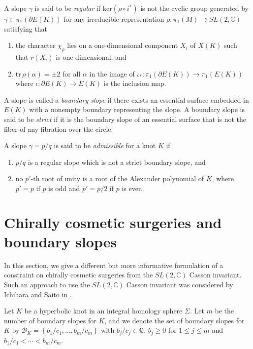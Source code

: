 \documentclass{amsart}
\theoremstyle{remark}
\theoremstyle{definition}
\begin{document}
A slope $\gamma$ is said to be \textit{regular} 
if $\mathrm{ker} (\rho \circ i^*)$ is not the cyclic group generated by $\gamma \in \pi_1 (\partial E(K))$ 
for any irreducible representation $\rho : \pi_1 (M) \to SL (2, \mathbb{C})$ satisfying that 
\begin{enumerate}
\item
the character $\chi_\rho$ lies on a one-dimensional component $X_i$ of $X(K)$ such that $r(X_i)$ is one-dimensional, and 
\item
$\mathrm{tr}\, \rho(\alpha) = \pm 2$ for all $\alpha$ in the image of %
 $\iota_* : \pi_1 (\partial E(K)) \to  \pi_1 (E(K))$ where $\iota:\partial E(K) \rightarrow E(K)$ is the inclusion map.
\end{enumerate}

A slope is called a \textit{boundary slope} if there exists an essential surface embedded in $E(K)$ with a nonempty boundary representing the slope. A boundary slope is said to be \textit{strict} if it is the boundary slope of an essential surface that is not the fiber of any fibration over the circle. 


A slope $\gamma = p/q$ is said to be \textit{admissible} for a knot $K$ if 
\begin{enumerate}
\item 
$p/q$ is a regular slope which is not a strict boundary slope, and 
\item
no $p'$-th root of unity is a root of the Alexander polynomial of $K$, where $p' = p$ if $p$ is odd and $p' =p/2$ if $p$ is even.
\end{enumerate}



\section{Chirally cosmetic surgeries and boundary slopes}\label{sec:bdryslope}

In this section, we give a different but more informative formulation of a constraint on chirally cosmetic surgeries from the $SL(2,\mathbb{C})$ Casson invariant. 
Such an approach to use the $SL(2,\mathbb{C})$ Casson invariant was considered by Ichihara and Saito in \cite{IchiharaSaito}. 


Let $K$ be a hyperbolic knot in an integral homology sphere $\Sigma$. 
Let $m$ be the number of boundary slopes for $K$, 
and we denote the set of boundary slopes for $K$ by $\mathcal{B}_K = \left\{ b_1 / c_1 ,\ldots , b_m/c_m \right\}$ 
with  $b_j / c_j \in \mathbb{Q}$, $b_j \ge 0$ for $1 \le j \le m$ and ${b_1}/{c_1} < \cdots < {b_m}/{c_m} $. 
\end{document}

